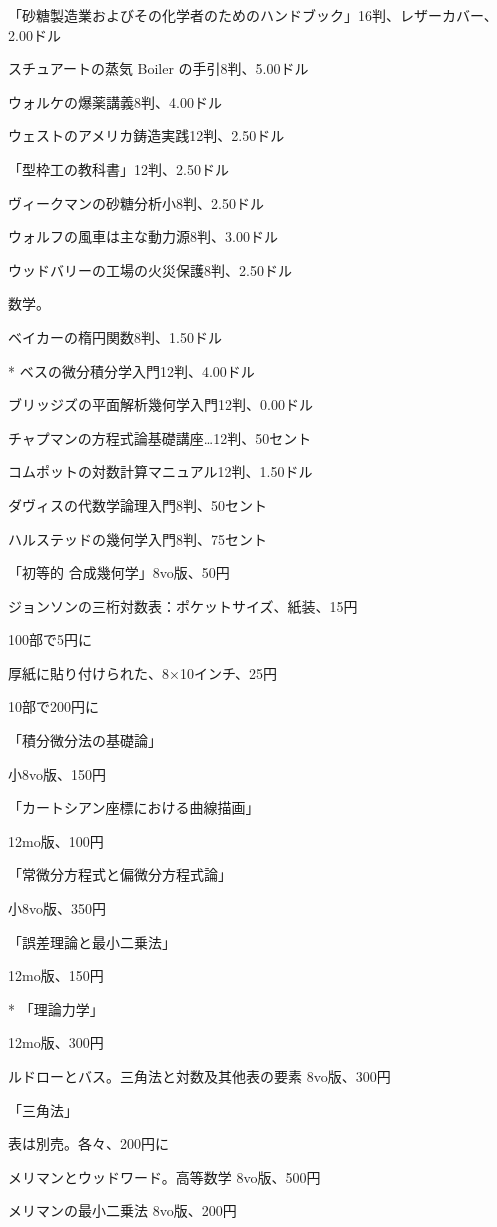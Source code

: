 \documentclass[a4paper,11pt,openany]{ltjsbook}
\begin{document}
「砂糖製造業およびその化学者のためのハンドブック」16判、レザーカバー、2.00ドル

スチュアートの蒸気 Boiler の手引8判、5.00ドル

ウォルケの爆薬講義8判、4.00ドル

ウェストのアメリカ鋳造実践12判、2.50ドル

「型枠工の教科書」12判、2.50ドル

ヴィークマンの砂糖分析小8判、2.50ドル

ウォルフの風車は主な動力源8判、3.00ドル

ウッドバリーの工場の火災保護8判、2.50ドル

数学。

ベイカーの楕円関数8判、1.50ドル

* ベスの微分積分学入門12判、4.00ドル

ブリッジズの平面解析幾何学入門12判、0.00ドル

チャプマンの方程式論基礎講座…12判、50セント

コムポットの対数計算マニュアル12判、1.50ドル

ダヴィスの代数学論理入門8判、50セント

ハルステッドの幾何学入門8判、75セント

「初等的 合成幾何学」8vo版、50円

ジョンソンの三桁対数表：ポケットサイズ、紙装、15円

100部で5円に

厚紙に貼り付けられた、8×10インチ、25円

10部で200円に

「積分微分法の基礎論」

小8vo版、150円

「カートシアン座標における曲線描画」

12mo版、100円

「常微分方程式と偏微分方程式論」

小8vo版、350円

「誤差理論と最小二乗法」

12mo版、150円

* 「理論力学」

12mo版、300円

ルドローとバス。三角法と対数及其他表の要素 8vo版、300円

「三角法」

表は別売。各々、200円に

メリマンとウッドワード。高等数学 8vo版、500円

メリマンの最小二乗法 8vo版、200円
\end{document}
